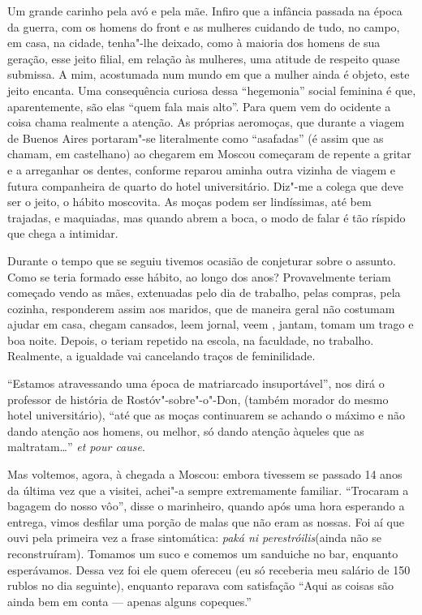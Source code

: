 Um grande carinho pela avó e pela mãe. Infiro que a infância passada na
época da guerra, com os homens do front e as mulheres cuidando de tudo,
no campo, em casa, na cidade, tenha"-lhe deixado, como à maioria dos
homens de sua geração, esse jeito filial, em relação às mulheres, uma
atitude de respeito quase submissa. A mim, acostumada num mundo em que a
mulher ainda é objeto, este jeito encanta. Uma consequência curiosa
dessa ``hegemonia'' social feminina é que, aparentemente, são elas
``quem fala mais alto''. Para quem vem do ocidente a coisa chama
realmente a atenção. As próprias aeromoças, que durante a viagem de
Buenos Aires portaram"-se literalmente como ``asafadas'' (é assim que as
chamam, em castelhano) ao chegarem em Moscou começaram de repente a
gritar e a arreganhar os dentes, conforme reparou aminha outra vizinha
de viagem e futura companheira de quarto do hotel universitário. Diz"-me
a colega que deve ser o jeito, o hábito moscovita. As moças podem ser
lindíssimas, até bem trajadas, e maquiadas, mas quando abrem a boca, o
modo de falar é tão ríspido que chega a intimidar.

Durante o tempo que se seguiu tivemos ocasião de conjeturar sobre o
assunto. Como se teria formado esse hábito, ao longo dos anos?
Provavelmente teriam começado vendo as mães, extenuadas pelo dia de
trabalho, pelas compras, pela cozinha, responderem assim aos maridos,
que de maneira geral não costumam ajudar em casa, chegam cansados, leem
jornal, veem , jantam, tomam um trago e boa noite. Depois, o teriam
repetido na escola, na faculdade, no trabalho. Realmente, a igualdade
vai cancelando traços de feminilidade.

``Estamos atravessando uma época de matriarcado insuportável'', nos dirá
o professor de história de Rostóv"-sobre"-o"-Don, (também morador do mesmo
hotel universitário), ``até que as moças continuarem se achando o máximo
e não dando atenção aos homens, ou melhor, só dando atenção àqueles que
as maltratam\ldots{}'' \emph{et pour cause}.

Mas voltemos, agora, à chegada a Moscou: embora tivessem se passado 14
anos da última vez que a visitei, achei"-a sempre extremamente familiar.
``Trocaram a bagagem do nosso vôo'', disse o marinheiro, quando após uma
hora esperando a entrega, vimos desfilar uma porção de malas que não
eram as nossas. Foi aí que ouvi pela primeira vez a frase sintomática:
\emph{paká ni perestróilis}(ainda não se reconstruíram). Tomamos um suco
e comemos um sanduiche no bar, enquanto esperávamos. Dessa vez foi ele
quem ofereceu (eu só receberia meu salário de 150 rublos no dia
seguinte), enquanto reparava com satisfação ``Aqui as coisas são ainda
bem em conta --- apenas alguns copeques.''

